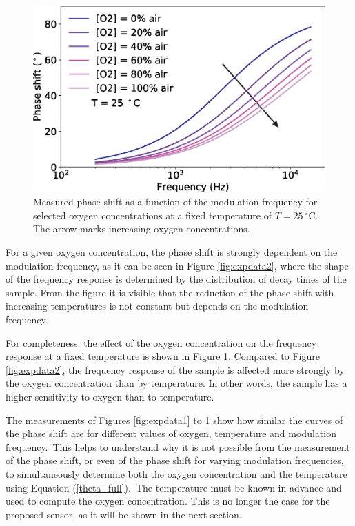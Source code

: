 \documentclass[sensors,article,accept,moreauthors,pdftex,10pt,a4paper]{Definitions/mdpi}
\theoremstyle{definition}
\begin{document}
\begin{figure}[H]
\centering
\includegraphics[width=9 cm]{phase_f_O2.eps}
\caption{Measured phase shift as a function of the modulation frequency for selected oxygen concentrations at a fixed temperature of $T=25 \ ^{\circ}$C. The arrow marks increasing oxygen concentrations.}
\label{fig:expdata3}
\end{figure}

For a given oxygen concentration, the phase shift is strongly dependent on the modulation frequency, as it can be seen in Figure \ref{fig:expdata2}, where the shape of the frequency response is determined by the distribution of decay times of the sample. From the figure it is visible that the reduction of the phase shift with increasing temperatures is not constant but depends on the modulation frequency.



For completeness, the effect of the oxygen concentration on the frequency response at a fixed temperature is shown in Figure \ref{fig:expdata3}. Compared to Figure \ref{fig:expdata2}, the frequency response of the sample is affected more strongly by the oxygen concentration than by temperature. In other words, the sample has a higher sensitivity to oxygen than to temperature.



The measurements of Figures \ref{fig:expdata1} to \ref{fig:expdata3} show how similar the curves of the phase shift are for different values of oxygen, temperature and modulation frequency.~This helps to understand why it is not possible from the measurement of the phase shift, or even of the phase shift for varying modulation frequencies, to simultaneously determine both the oxygen concentration and the temperature using Equation (\ref{theta_full}).~The temperature must be known in advance and used to compute the oxygen concentration. This is no longer the case for the proposed sensor, as it will be shown in the next section. 
\end{document}
